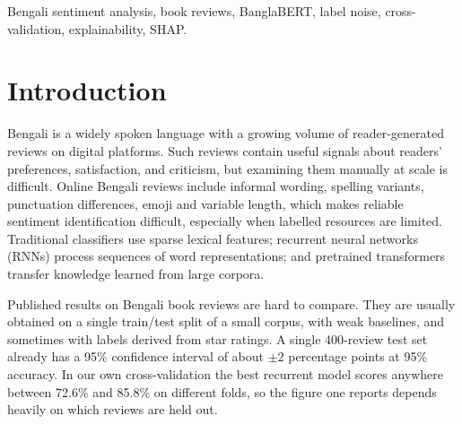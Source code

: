 \documentclass[journal]{IEEEtran}
\begin{document}
\begin{IEEEkeywords}
Bengali sentiment analysis, book reviews, BanglaBERT, label noise, cross-validation, explainability, SHAP.
\end{IEEEkeywords}

\IEEEpeerreviewmaketitle

\section{Introduction}
Bengali is a widely spoken language with a growing volume of reader-generated reviews on digital platforms. Such reviews contain useful signals about readers' preferences, satisfaction, and criticism, but examining them manually at scale is difficult. Online Bengali reviews include informal wording, spelling variants, punctuation differences, emoji and variable length, which makes reliable sentiment identification difficult, especially when labelled resources are limited. Traditional classifiers use sparse lexical features; recurrent neural networks (RNNs) process sequences of word representations; and pretrained transformers transfer knowledge learned from large corpora.

Published results on Bengali book reviews are hard to compare. They are usually obtained on a single train/test split of a small corpus, with weak baselines, and sometimes with labels derived from star ratings. A single 400-review test set already has a 95\% confidence interval of about $\pm 2$ percentage points at 95\% accuracy. In our own cross-validation the best recurrent model scores anywhere between 72.6\% and 85.8\% on different folds, so the figure one reports depends heavily on which reviews are held out.
\end{document}
